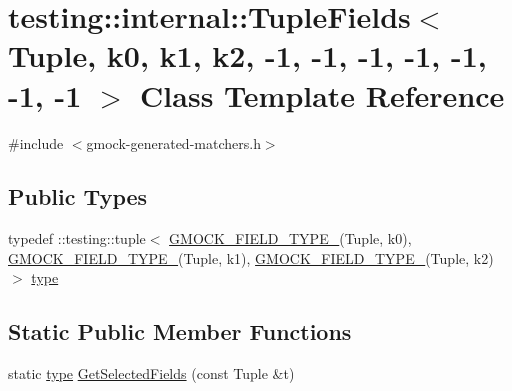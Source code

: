 \hypertarget{classtesting_1_1internal_1_1TupleFields_3_01Tuple_00_01k0_00_01k1_00_01k2_00_01-1_00_01-1_00_01-d40fb0064dd627afc9c2b7f6513ffcb3}{}\section{testing\+::internal\+::Tuple\+Fields$<$ Tuple, k0, k1, k2, -\/1, -\/1, -\/1, -\/1, -\/1, -\/1, -\/1 $>$ Class Template Reference}
\label{classtesting_1_1internal_1_1TupleFields_3_01Tuple_00_01k0_00_01k1_00_01k2_00_01-1_00_01-1_00_01-d40fb0064dd627afc9c2b7f6513ffcb3}


{\ttfamily \#include $<$gmock-\/generated-\/matchers.\+h$>$}

\subsection*{Public Types}
\begin{DoxyCompactItemize}
\item 
typedef \+::testing\+::tuple$<$ \mbox{\hyperlink{gmock-generated-matchers_8h_acf3e27de83a73f0d873da1cd471e505b}{G\+M\+O\+C\+K\+\_\+\+F\+I\+E\+L\+D\+\_\+\+T\+Y\+P\+E\+\_\+}}(Tuple, k0), \mbox{\hyperlink{gmock-generated-matchers_8h_acf3e27de83a73f0d873da1cd471e505b}{G\+M\+O\+C\+K\+\_\+\+F\+I\+E\+L\+D\+\_\+\+T\+Y\+P\+E\+\_\+}}(Tuple, k1), \mbox{\hyperlink{gmock-generated-matchers_8h_acf3e27de83a73f0d873da1cd471e505b}{G\+M\+O\+C\+K\+\_\+\+F\+I\+E\+L\+D\+\_\+\+T\+Y\+P\+E\+\_\+}}(Tuple, k2)$>$ \mbox{\hyperlink{classtesting_1_1internal_1_1TupleFields_3_01Tuple_00_01k0_00_01k1_00_01k2_00_01-1_00_01-1_00_01-d40fb0064dd627afc9c2b7f6513ffcb3_a2ae5a8ddd1bd868f6905cfde5105f49e}{type}}
\end{DoxyCompactItemize}
\subsection*{Static Public Member Functions}
\begin{DoxyCompactItemize}
\item 
static \mbox{\hyperlink{classtesting_1_1internal_1_1TupleFields_3_01Tuple_00_01k0_00_01k1_00_01k2_00_01-1_00_01-1_00_01-d40fb0064dd627afc9c2b7f6513ffcb3_a2ae5a8ddd1bd868f6905cfde5105f49e}{type}} \mbox{\hyperlink{classtesting_1_1internal_1_1TupleFields_3_01Tuple_00_01k0_00_01k1_00_01k2_00_01-1_00_01-1_00_01-d40fb0064dd627afc9c2b7f6513ffcb3_a6dd8fa8ae2996c755e0f61a99ea07858}{Get\+Selected\+Fields}} (const Tuple \&t)
\end{DoxyCompactItemize}


